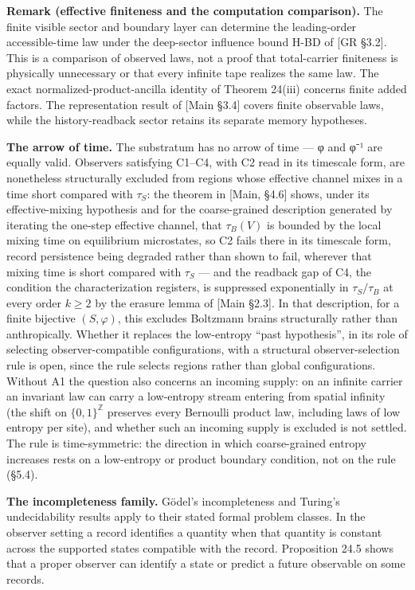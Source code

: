 \documentclass[
]{article}
\begin{document}
\textbf{Remark (effective finiteness and the computation comparison).}
The finite visible sector and boundary layer can determine the
leading-order accessible-time law under the deep-sector influence bound
H-BD of {[}GR §3.2{]}. This is a comparison of observed laws, not a
proof that total-carrier finiteness is physically unnecessary or that
every infinite tape realizes the same law. The exact
normalized-product-ancilla identity of Theorem 24(iii) concerns finite
added factors. The representation result of {[}Main §3.4{]} covers
finite observable laws, while the history-readback sector retains its
separate memory hypotheses.

\textbf{The arrow of time.} The substratum has no arrow of time --- φ
and φ⁻¹ are equally valid. Observers satisfying C1--C4, with C2 read in
its timescale form, are nonetheless structurally excluded from regions
whose effective channel mixes in a time short compared with \(\tau_S\):
the theorem in {[}Main, §4.6{]} shows, under its effective-mixing
hypothesis and for the coarse-grained description generated by iterating
the one-step effective channel, that \(\tau_B(V)\) is bounded by the
local mixing time on equilibrium microstates, so C2 fails there in its
timescale form, record persistence being degraded rather than shown to
fail, wherever that mixing time is short compared with \(\tau_S\) ---
and the readback gap of C4, the condition the characterization
registers, is suppressed exponentially in \(\tau_S/\tau_B\) at every
order \(k \geq 2\) by the erasure lemma of {[}Main §2.3{]}. In that
description, for a finite bijective \((S,\varphi)\), this excludes
Boltzmann brains structurally rather than anthropically. Whether it
replaces the low-entropy ``past hypothesis'', in its role of selecting
observer-compatible configurations, with a structural observer-selection
rule is open, since the rule selects regions rather than global
configurations. Without A1 the question also concerns an incoming
supply: on an infinite carrier an invariant law can carry a low-entropy
stream entering from spatial infinity (the shift on
\(\{0,1\}^{\mathbb Z}\) preserves every Bernoulli product law, including
laws of low entropy per site), and whether such an incoming supply is
excluded is not settled. The rule is time-symmetric: the direction in
which coarse-grained entropy increases rests on a low-entropy or product
boundary condition, not on the rule (§5.4).

\textbf{The incompleteness family.} Gödel's incompleteness and Turing's
undecidability results apply to their stated formal problem classes. In
the observer setting a record identifies a quantity when that quantity
is constant across the supported states compatible with the record.
Proposition 24.5 shows that a proper observer can identify a state or
predict a future observable on some records.
\end{document}

